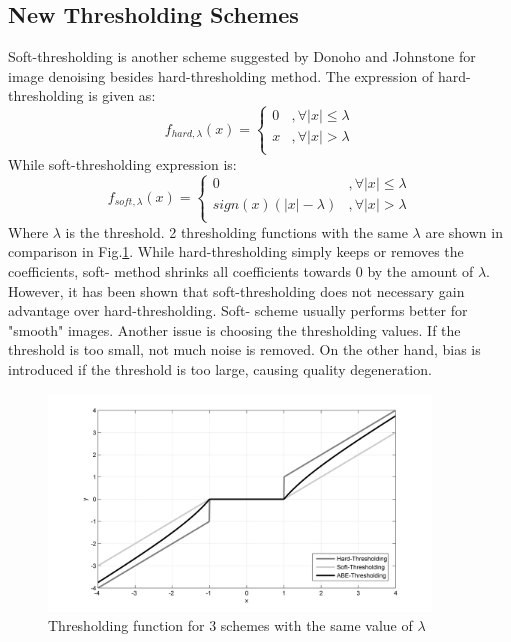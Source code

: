 \documentclass[11pt]{article}
\begin{document}
\subsection{New Thresholding Schemes}
Soft-thresholding is another scheme suggested by Donoho and Johnstone \cite{Donoho_1994, Donoho_1995} for image denoising besides hard-thresholding method. The expression of hard-thresholding is given as:
$$
f_{hard, \lambda}(x) = \left\{{\begin{array}{cc}
    0 &, \forall |x| \le \lambda \\
	x &, \forall |x| > \lambda\\
\end{array}} \right.
$$
While soft-thresholding expression is:
$$
f_{soft, \lambda}(x) = \left\{{\begin{array}{cc}
    0 &, \forall |x| \le \lambda \\
	sign(x)(|x|-\lambda) &, \forall |x| > \lambda\\
\end{array}} \right.
$$
Where $\lambda$ is the threshold. 2 thresholding functions with the same $\lambda$ are shown in comparison in Fig.\ref{Fig_3SchemesThresholding}. While hard-thresholding simply keeps or removes the coefficients, soft- method shrinks all coefficients towards 0 by the amount of $\lambda$. However, it has been shown that soft-thresholding does not necessary gain advantage over hard-thresholding. Soft- scheme usually performs better for "smooth" images. Another issue is choosing the thresholding values. If the threshold is too small, not much noise is removed. On the other hand, bias is introduced if the threshold is too large, causing quality degeneration. 

\begin{figure}[H]
	\centering
	\includegraphics[trim=0.5in 0.1in 0.5in 0in, width=4in]{Fig_3SchemesThresholding.png}
	\caption{Thresholding function for 3 schemes with the same value of $\lambda$}
	\label{Fig_3SchemesThresholding}
\end{figure}
\end{document}
